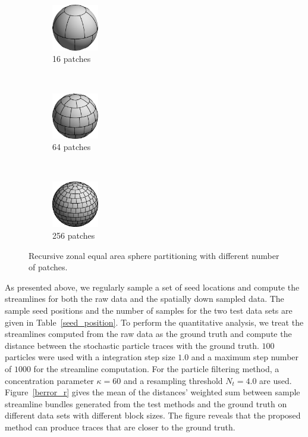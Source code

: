 \begin{figure}[htb!f]
  \centering
  \begin{subfigure}[b]{0.16\textwidth}
    \centering
    \includegraphics[width=0.8in]{../figures/rzeasp_16.eps}
    \caption{16 patches}
  \end{subfigure}~
  \begin{subfigure}[b]{0.16\textwidth}
    \centering
    \includegraphics[width=0.8in]{../figures/rzeasp_64.eps}
    \caption{64 patches}
  \end{subfigure}~
  \begin{subfigure}[b]{0.16\textwidth}
    \centering
    \includegraphics[width=0.8in]{../figures/rzeasp_256.eps}
    \caption{256 patches}
  \end{subfigure}
  \caption{Recursive zonal equal area sphere partitioning with different number of patches.}
  \label{rzeasp}
\end{figure}

As presented above, we regularly sample a set of seed locations and compute the streamlines for both the raw data and the spatially down sampled data. The sample seed positions and the number of samples for the two test data sets are given in Table~\ref{seed_position}. To perform the quantitative analysis, we treat the streamlines computed from the raw data as the ground truth and compute the distance between the stochastic particle traces with the ground truth. $100$ particles were used with a integration step size $1.0$ and a maximum step number of $1000$ for the streamline computation. For the particle filtering method, a concentration parameter $\kappa = 60$ and a resampling threshold $N_t = 4.0$ are used. Figure~\ref{berror_r} gives the mean of the distances' weighted sum between sample streamline bundles generated from the test methods and the ground truth on different data sets with different block sizes. The figure reveals that the proposed method can produce traces that are closer to the ground truth.

